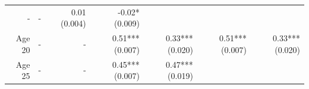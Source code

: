 \documentclass[]{article}
\begin{document}
\begin{longtable}[c]{@{}rrrrrrr@{}}
\begin{minipage}[t]{0.11\columnwidth}
-
\strut\end{minipage} &
\begin{minipage}[t]{0.12\columnwidth}\raggedleft\strut
-
\strut\end{minipage} &
\begin{minipage}[t]{0.11\columnwidth}\raggedleft\strut
0.01 (0.004)
\strut\end{minipage} &
\begin{minipage}[t]{0.11\columnwidth}\raggedleft\strut
-0.02* (0.009)
\strut\end{minipage}\tabularnewline
\begin{minipage}[t]{0.12\columnwidth}\raggedleft\strut
Age 20
\strut\end{minipage} &
\begin{minipage}[t]{0.11\columnwidth}\raggedleft\strut
-
\strut\end{minipage} &
\begin{minipage}[t]{0.12\columnwidth}\raggedleft\strut
-
\strut\end{minipage} &
\begin{minipage}[t]{0.11\columnwidth}\raggedleft\strut
0.51*** (0.007)
\strut\end{minipage} &
\begin{minipage}[t]{0.12\columnwidth}\raggedleft\strut
0.33*** (0.020)
\strut\end{minipage} &
\begin{minipage}[t]{0.11\columnwidth}\raggedleft\strut
0.51*** (0.007)
\strut\end{minipage} &
\begin{minipage}[t]{0.11\columnwidth}\raggedleft\strut
0.33*** (0.020)
\strut\end{minipage}\tabularnewline
\begin{minipage}[t]{0.12\columnwidth}\raggedleft\strut
Age 25
\strut\end{minipage} &
\begin{minipage}[t]{0.11\columnwidth}\raggedleft\strut
-
\strut\end{minipage} &
\begin{minipage}[t]{0.12\columnwidth}\raggedleft\strut
-
\strut\end{minipage} &
\begin{minipage}[t]{0.11\columnwidth}\raggedleft\strut
0.45*** (0.007)
\strut\end{minipage} &
\begin{minipage}[t]{0.12\columnwidth}\raggedleft\strut
0.47*** (0.019)
\strut\end{minipage} &

\end{longtable}
\end{document}
